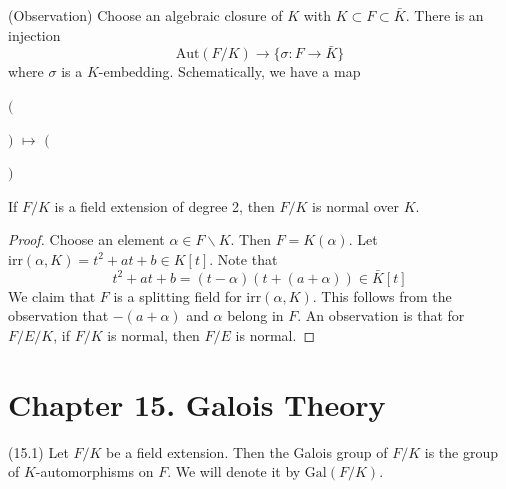 \vspace{2ex}
\begin{rmk}
(Observation) Choose an algebraic closure of $K$ with $K\subset F\subset \bar{K}$. There is an injection
\[\mathrm{Aut}(F/K)\rightarrow \{\sigma :F\rightarrow \bar{K}\}\]
where $\sigma $ is a $K$-embedding. Schematically, we have a map 
\newline
\begin{center}
$\Bigg($
$\Bigg)$
$\longmapsto$
$\Bigg($
$\Bigg)$
\end{center}
\end{rmk}
\vspace{2ex}
\begin{prop}
If $F/K$ is a field extension of degree 2, then $F/K$ is normal over $K$. 
\end{prop}
\vspace{2ex}
\begin{proof}
Choose an element $\alpha \in F\backslash K$. Then $F=K(\alpha )$. Let $\mathrm{irr}(\alpha ,K)=t^2+at+b\in K[t]$. Note that
\[t^2+at+b=(t-\alpha )(t+(a+\alpha ))\in \bar{K}[t]\]
We claim that $F$ is a splitting field for $\mathrm{irr}(\alpha ,K)$. This follows from the observation that $-(a+\alpha )$ and $\alpha $ belong in $F$. An observation is that for $F/E/K$, if $F/K$ is normal, then $F/E$ is normal.
\end{proof}
\vspace{2ex}
\section{Chapter 15. Galois Theory}
\begin{defi}
(15.1) Let $F/K$ be a field extension. Then the Galois group of $F/K$ is the group of $K$-automorphisms on $F$. We will denote it by $\mathrm{Gal}(F/K)$.
\end{defi}
\vspace{2ex}

